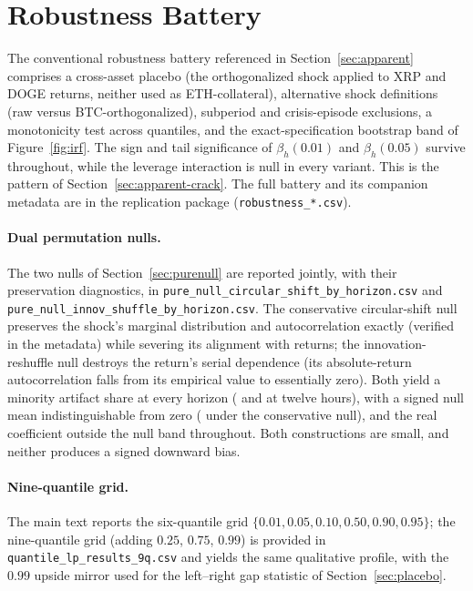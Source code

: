 \section{Robustness Battery}
\label{app:robustness}

The conventional robustness battery referenced in
Section~\ref{sec:apparent} comprises a cross-asset placebo (the
orthogonalized shock applied to XRP and DOGE returns, neither used as
ETH-collateral), alternative shock definitions (raw versus
BTC-orthogonalized), subperiod and crisis-episode exclusions, a
monotonicity test across quantiles, and the exact-specification bootstrap
band of Figure~\ref{fig:irf}. The sign and tail significance of
$\beta_h(0.01)$ and $\beta_h(0.05)$ survive throughout, while the leverage
interaction is null in every variant. This is the pattern of
Section~\ref{sec:apparent-crack}. The full battery and its companion
metadata are in the replication package (\texttt{robustness\_*.csv}).

\paragraph{Dual permutation nulls.}
The two nulls of Section~\ref{sec:purenull} are reported jointly, with their
preservation diagnostics, in
\texttt{pure\_\allowbreak null\_\allowbreak circular\_\allowbreak shift\_\allowbreak by\_\allowbreak horizon.csv} and
\texttt{pure\_\allowbreak null\_\allowbreak innov\_\allowbreak shuffle\_\allowbreak by\_\allowbreak horizon.csv}. The conservative
circular-shift null preserves the shock's marginal distribution and
autocorrelation exactly (verified in the metadata) while severing its
alignment with returns; the innovation-reshuffle null destroys the return's
serial dependence (its absolute-return autocorrelation falls from
its empirical value to essentially zero). Both yield a minority artifact
share at every horizon (\PnCircHtwelve{} and \PnInnovHtwelve{} at twelve
hours), with a signed null mean indistinguishable from zero
(\PnCircSignedHtwelve{} under the conservative null), and the real
coefficient outside the null band throughout. Both constructions are small,
and neither produces a signed downward bias.

\paragraph{Nine-quantile grid.}
The main text reports the six-quantile grid
$\{0.01,\allowbreak 0.05,\allowbreak 0.10,\allowbreak 0.50,\allowbreak 0.90,\allowbreak
0.95\}$; the nine-quantile grid (adding
$0.25$, $0.75$, $0.99$) is provided in \texttt{quantile\_\allowbreak lp\_\allowbreak results\_\allowbreak 9q.csv}
and yields the same qualitative profile, with the $0.99$ upside mirror used
for the left--right gap statistic of Section~\ref{sec:placebo}.